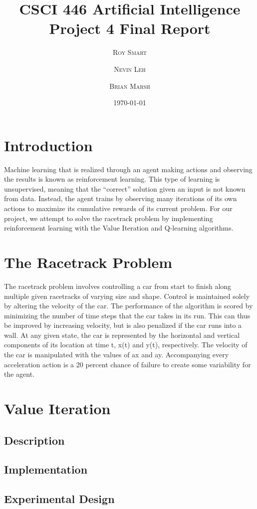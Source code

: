 \documentclass{article}
\title{\vspace{-15mm}\fontsize{24pt}{10pt}\selectfont\textbf{CSCI 446 Artificial Intelligence \\[2mm] Project 4 Final Report} } %
\date{\today}
\author{
\large
\textsc{Roy Smart} \and \textsc{Nevin Leh} \and \textsc{Brian Marsh}\\[2mm] %
}
\begin{document}
	\maketitle %
	\thispagestyle{fancy} %
	\normalsize

	\section{Introduction}
		Machine learning that is realized through an agent making actions and observing the results is known as reinforcement learning.  This type of learning is unsupervised, meaning that the “correct” solution given an input is not known from data.  Instead, the agent trains by observing many iterations of its own actions to maximize its cumulative rewards of its current problem.  For our project, we attempt to solve the racetrack problem by implementing reinforcement learning with the Value Iteration and Q-learning algorithms.
	\section{The Racetrack Problem}
		The racetrack problem involves controlling a car from start to finish along multiple given racetracks of varying size and shape.  Control is maintained solely by altering the velocity of the car.  The performance of the algorithm is scored by minimizing the number of time steps that the car takes in its run.  This can thus be improved by increasing velocity, but is also penalized if the car runs into a wall.  At any given state, the car is represented by the horizontal and vertical components of its location at time t, x(t) and y(t), respectively.  The velocity of the car is manipulated with the values of ax and ay.  Accompanying every acceleration action is a 20 percent chance of failure to create some variability for the agent.
	\section{Value Iteration}
		\subsection{Description}
		\subsection{Implementation}
		\subsection{Experimental Design}
\end{document}

